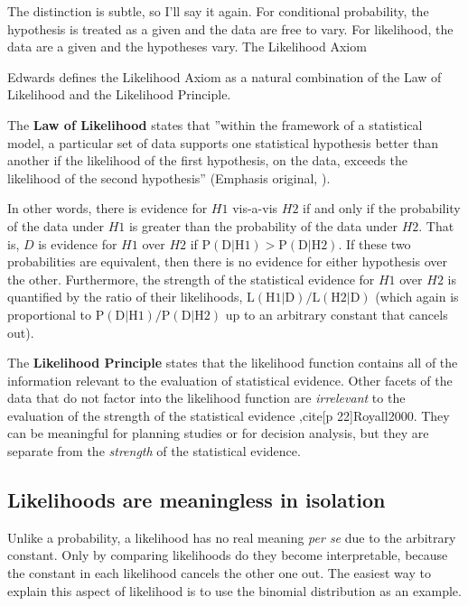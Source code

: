 The distinction is subtle, so I'll say it again. For conditional probability, the hypothesis is treated as a given and the data are free to vary. For likelihood, the data are a given and the hypotheses vary.
The Likelihood Axiom

Edwards \cite[p 30]{Edwards1992} defines the Likelihood Axiom as a natural combination of the Law of Likelihood and the Likelihood Principle.

The \textbf{Law of Likelihood} states that ''within the framework of a statistical model, a particular set of data supports one statistical hypothesis better than another if the likelihood of the first hypothesis, on the data, exceeds the likelihood of the second hypothesis'' (Emphasis original, \cite[p 30]{Edwards1992}).

In other words, there is evidence for $H1$ vis-a-vis $H2$ if and only if the probability of the data under $H1$ is greater than the probability of the data under $H2$. That is, $D$ is evidence for $H1$ over $H2$ if $\mathrm{P}(\mathrm{D} | \mathrm{H} 1)>\mathrm{P}(\mathrm{D} | \mathrm{H} 2)$. If these two probabilities are equivalent, then there is no evidence for either hypothesis over the other. Furthermore, the strength of the statistical evidence for $H1$ over $H2$ is quantified by the ratio of their likelihoods, $\mathrm{L}(\mathrm{H} 1 | \mathrm{D}) / \mathrm{L}(\mathrm{H} 2 | \mathrm{D})$ (which again is proportional to $\mathrm{P}(\mathrm{D} | \mathrm{H} 1) / \mathrm{P}(\mathrm{D} | \mathrm{H} 2)$ up to an arbitrary constant that cancels out).

The \textbf{Likelihood Principle} states that the likelihood function contains all of the information relevant to the evaluation of statistical evidence. Other facets of the data that do not factor into the likelihood function are \textit{irrelevant} to the evaluation of the strength of the statistical evidence 
\cite[p 30]{Edwards1992},cite[p 22]{Royall2000}. They can be meaningful for planning studies or for decision analysis, but they are separate from the 
\textit{strength} of the statistical evidence.

\subsection{Likelihoods are meaningless in isolation}

Unlike a probability, a likelihood has no real meaning \textit{per se} due to the arbitrary constant. Only by comparing likelihoods do they become interpretable, because the constant in each likelihood cancels the other one out. The easiest way to explain this aspect of likelihood is to use the binomial distribution as an example.

